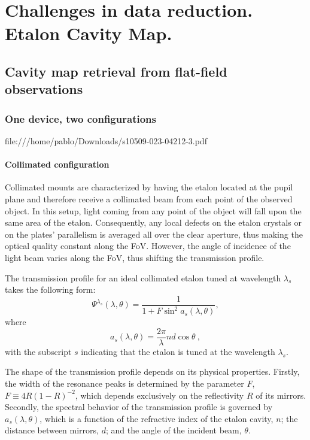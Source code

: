 \chapter{\label{CH:challenges}Challenges in data reduction. Etalon Cavity Map.}

\section{\label{ch3: cavity map}Cavity map retrieval from flat-field observations}



\subsection{One device, two configurations}

file:///home/pablo/Downloads/s10509-023-04212-3.pdf



\subsubsection{Collimated configuration}

Collimated mounts are characterized by having the etalon located at the pupil plane and therefore receive a collimated beam from each point of the observed object. In this setup, light coming from any point of the object will fall upon the same area of the etalon. Consequently, any local defects on the etalon crystals or on the plates' parallelism is averaged all over the clear aperture, thus making the optical quality constant along the FoV. However, the angle of incidence of the light beam varies along the FoV, thus shifting the transmission profile.  

 The transmission profile for an ideal collimated etalon tuned at wavelength $\lambda _ s$ takes the following form:
\begin{equation}
\Psi ^{\lambda _ s} (\lambda, \theta) = \frac{1}{1 + F \sin ^2 a_s (\lambda,\theta) },
\end{equation}
where
\begin{equation}
a_s (\lambda, \theta) =\frac{2  \pi}{\lambda} nd\cos \theta  \ ,
\label{eq: a-def}
\end{equation}
with the subscript $s$ indicating that the etalon is tuned at the wavelength $\lambda_s$.

The shape of the transmission profile depends on its physical properties. Firstly, the width of the resonance peaks is determined by the parameter $F$, $F \equiv 4R (1 - R )^{-2}$, which depends exclusively on the reflectivity $R$ of its mirrors. Secondly, the spectral behavior of the transmission profile is governed by $a_s(\lambda,\theta)$, which is a function of the refractive index of the etalon cavity, $n$; the distance between mirrors, $d$; and the angle of the incident beam, $\theta$. 

